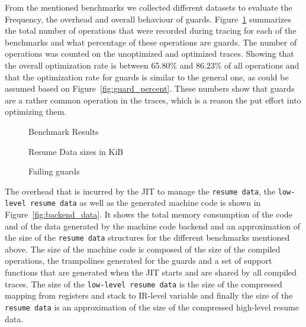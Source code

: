 \documentclass[10pt,preprint]{sigplanconf}
\begin{document}
From the mentioned benchmarks we collected different datasets to evaluate the
Frequency, the overhead and overall behaviour of guards.
Figure~\ref{fig:benchmarks} summarizes the total number of operations that were
recorded during tracing for each of the benchmarks and what percentage of these
operations are guards. The number of operations was counted on the unoptimized
and optimized traces. Showing that the overall optimization rate is between
65.80\% and 86.23\% of all operations and that the optimization rate for guards
is similar to the general one, as could be assumed based on
Figure~\ref{fig:guard_percent}. These numbers show that guards are a rather
common operation in the traces, which is a reason the put effort into
optimizing them.

\begin{figure}
    
    \caption{Benchmark Results}
    \label{fig:benchmarks}
\end{figure}

\begin{figure}
    
    \caption{Resume Data sizes in KiB}
    \label{fig:resume_data_sizes}
\end{figure}

\begin{figure}
    
    \caption{Failing guards}
    \label{fig:failing_guards}
\end{figure}



The overhead that is incurred by the JIT to manage the \texttt{resume data},
the \texttt{low-level resume data} as well as the generated machine code is
shown in Figure~\ref{fig:backend_data}. It shows the total memory consumption
of the code and of the data generated by the machine code backend and an
approximation of the size of the \texttt{resume data} structures for the
different benchmarks mentioned above. The size of the machine code is composed
of the size of the compiled operations, the trampolines generated for the
guards and a set of support functions that are generated when the JIT starts
and are shared by all compiled traces. The size of the \texttt{low-level resume
data} is the size of the compressed mapping from registers and stack to
IR-level variable and finally the size of the \texttt{resume data} is an
approximation of the size of the compressed high-level resume data.
\end{document}
